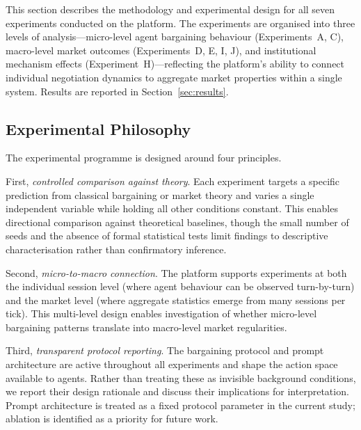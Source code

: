
\label{sec:experiments}

This section describes the methodology and experimental design for all seven experiments conducted on the platform.  The experiments are organised into three levels of analysis---micro-level agent bargaining behaviour (Experiments~A, C), macro-level market outcomes (Experiments~D, E, I, J), and institutional mechanism effects (Experiment~H)---reflecting the platform's ability to connect individual negotiation dynamics to aggregate market properties within a single system.  Results are reported in Section~\ref{sec:results}.

\subsection{Experimental Philosophy}
\label{sec:exp-philosophy}

The experimental programme is designed around four principles.

First, \emph{controlled comparison against theory}.  Each experiment targets a specific prediction from classical bargaining or market theory and varies a single independent variable while holding all other conditions constant.  This enables directional comparison against theoretical baselines, though the small number of seeds and the absence of formal statistical tests limit findings to descriptive characterisation rather than confirmatory inference.

Second, \emph{micro-to-macro connection}.  The platform supports experiments at both the individual session level (where agent behaviour can be observed turn-by-turn) and the market level (where aggregate statistics emerge from many sessions per tick).  This multi-level design enables investigation of whether micro-level bargaining patterns translate into macro-level market regularities.

Third, \emph{transparent protocol reporting}.  The bargaining protocol and prompt architecture are active throughout all experiments and shape the action space available to agents.  Rather than treating these as invisible background conditions, we report their design rationale and discuss their implications for interpretation.  Prompt architecture is treated as a fixed protocol parameter in the current study; ablation is identified as a priority for future work.

